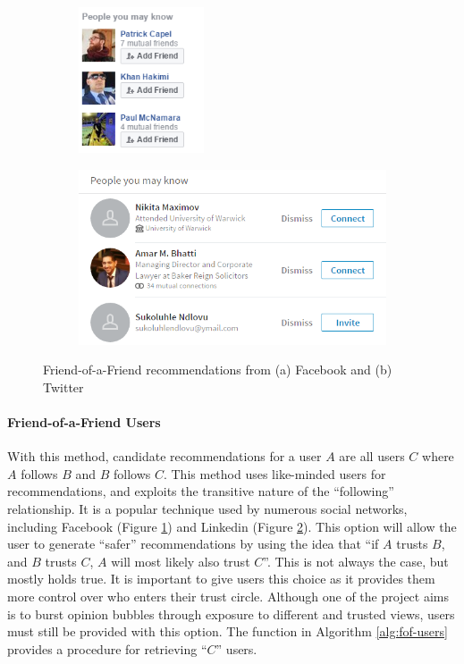 \begin{figure}[h]
	\centering
	\begin{subfigure}[b]{.3\linewidth}
		\includegraphics[height=1.7in]{Images/Design/facebook}
		\caption{}
		\label{fig:fof-facebook}
	\end{subfigure}
	\begin{subfigure}[b]{.5\linewidth}
		\includegraphics[width=1\linewidth]{Images/Design/linkedin}
		\caption{}
		\label{fig:fof-linkedin}
	\end{subfigure}
	\caption{Friend-of-a-Friend recommendations from (a) Facebook and (b) Twitter}
	\label{fig:fof}
\end{figure}

\paragraph{Friend-of-a-Friend Users}
With this method, candidate recommendations for a user $A$ are all users $C$ where $A$ follows $B$ and $B$ follows $C$. This method uses like-minded users for recommendations, and exploits the transitive nature of the ``following'' relationship. It is a popular technique used by numerous social networks, including Facebook (Figure \ref{fig:fof-facebook}) and Linkedin (Figure \ref{fig:fof-linkedin}). This option will allow the user to generate ``safer'' recommendations by using the idea that ``if $A$ trusts $B$, and $B$ trusts $C$, $A$ will most likely also trust $C$''. This is not always the case, but mostly holds true. It is important to give users this choice as it provides them more control over who enters their trust circle. Although one of the project aims is to burst opinion bubbles through exposure to different and trusted views, users must still be provided with this option. The function in Algorithm \ref{alg:fof-users} provides a procedure for retrieving ``$C$'' users. 

